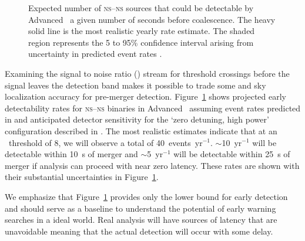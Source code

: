 \begin{figure}[h]
\caption{\label{fig:earlywarning}Expected number of \textsc{ns}--\textsc{ns}
sources that could be detectable by Advanced \LIGO\ a given number of seconds
before coalescence.  The heavy solid line is the most realistic yearly rate
estimate.  The shaded region represents the 5 to 95\% confidence interval
arising from uncertainty in predicted event rates \citep{Abadie:2010p10836}.}
\end{figure}
%
Examining the signal to noise ratio (\SNR{}) stream for threshold crossings
before the \GW{} signal leaves the detection band makes it possible to trade
some \SNR{} and sky localization accuracy for pre-merger detection.
Figure~\ref{fig:earlywarning} shows projected early detectability rates for
\textsc{ns}--\textsc{ns} binaries in Advanced \LIGO\ assuming event rates
predicted in \citet{Abadie:2010p10836} and anticipated detector sensitivity for
the `zero detuning, high power' configuration described in \citet{ALIGONoise}.
The most realistic estimates indicate that at an \SNR\ threshold of 8, we will
observe a total of 40~events~yr$^{-1}$. $\sim$10~yr$^{-1}$ will be detectable
within 10~s of merger and $\sim$5~yr$^{-1}$ will be detectable within 25~s of
merger if analysis can proceed with near zero latency. These rates are shown
with their substantial uncertainties in Figure~\ref{fig:earlywarning}.

We emphasize that Figure~\ref{fig:earlywarning} provides only the lower bound
for early detection and should serve as a baseline to understand the potential
of early warning \GW{} searches in a ideal world.  Real analysis will have
sources of latency that are unavoidable meaning that the actual detection will
occur with some delay. 


